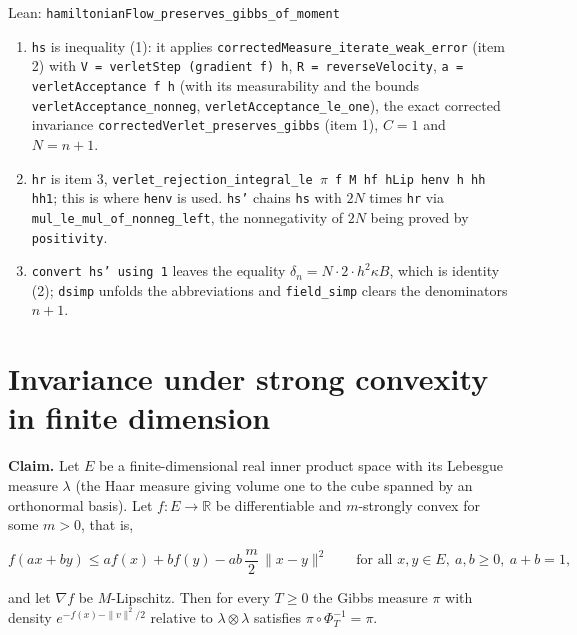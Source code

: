 \documentclass[11pt,a4paper]{article}
\begin{document}
\begin{leanbox}{Lean: \texttt{hamiltonianFlow\_\allowbreak{}preserves\_\allowbreak{}gibbs\_\allowbreak{}of\_\allowbreak{}moment}}
\begin{enumerate}
\item \texttt{hs} is inequality (1): it applies \texttt{corrected\allowbreak{}Measure\_\allowbreak{}iterate\_\allowbreak{}weak\_\allowbreak{}error} (item 2) with \texttt{V = verlet\allowbreak{}Step (gradient f) h}, \texttt{R = reverse\allowbreak{}Velocity}, \texttt{a = verlet\allowbreak{}Acceptance f h} (with its measurability and the bounds \texttt{verlet\allowbreak{}Acceptance\_\allowbreak{}nonneg}, \texttt{verlet\allowbreak{}Acceptance\_\allowbreak{}le\_\allowbreak{}one}), the exact corrected invariance \texttt{corrected\allowbreak{}Verlet\_\allowbreak{}preserves\_\allowbreak{}gibbs} (item 1), \(C=1\) and \(N=n+1\).

\item \texttt{hr} is item 3, \texttt{verlet\_\allowbreak{}rejection\_\allowbreak{}integral\_\allowbreak{}le \ensuremath{\pi} f M hf h\allowbreak{}Lip henv h hh hh1}; this is where \texttt{henv} is used. \texttt{hs'} chains \texttt{hs} with \(2N\) times \texttt{hr} via \texttt{mul\_\allowbreak{}le\_\allowbreak{}mul\_\allowbreak{}of\_\allowbreak{}nonneg\_\allowbreak{}left}, the nonnegativity of \(2N\) being proved by \texttt{positivity}.

\item \texttt{convert hs' using 1} leaves the equality \(\delta_n=N\cdot2\cdot h^2\kappa B\), which is identity (2); \texttt{dsimp} unfolds the abbreviations and \texttt{field\_\allowbreak{}simp} clears the denominators \(n+1\).

\end{enumerate}
\end{leanbox}

\section{\texorpdfstring{Invariance under strong convexity in finite dimension}{Invariance under strong convexity in finite dimension}}


\textbf{Claim.} Let \(E\) be a finite-dimensional real inner product space with its Lebesgue measure \(\lambda\) (the Haar measure giving volume one to the cube spanned by an orthonormal basis). Let \(f:E\to\mathbb R\) be differentiable and \(m\)-strongly convex for some \(m>0\), that is,


\[f(ax+by)\le af(x)+bf(y)-ab\,\frac m2\,\|x-y\|^2\qquad\text{for all }x,y\in E,\ a,b\ge0,\ a+b=1,\]


and let \(\nabla f\) be \(M\)-Lipschitz. Then for every \(T\ge0\) the Gibbs measure \(\pi\) with density \(e^{-f(x)-\|v\|^2/2}\) relative to \(\lambda\otimes\lambda\) satisfies \(\pi\circ\Phi_T^{-1}=\pi\).
\end{document}
